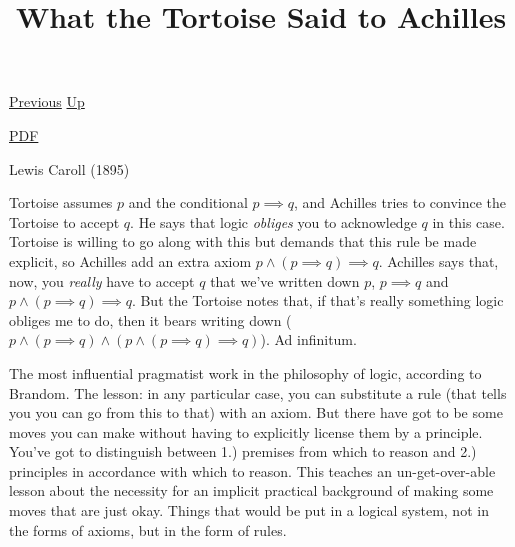 \documentclass[12pt,a4paper]{report}
\begin{document}
 \href{doc/phil/PhilProblems/Universals.html}{Previous} 
 \href{doc/phil/PhilProblems.html}{Up} 

 \href{doc/phil/PhilProblems/WhattheTortoiseSaidtoAchilles.pdf}{PDF} 
\title{What the Tortoise Said to Achilles}

Lewis Caroll (1895)

Tortoise assumes $p$ and the conditional $p \implies q$, and Achilles tries to convince the Tortoise to accept $q$. He says that logic \emph{obliges} you to acknowledge $q$ in this case. Tortoise is willing to go along with this but demands that this rule be made explicit, so Achilles add an extra axiom $p \land (p \implies q) \implies q$. Achilles says that, now, you \emph{really} have to accept $q$ that we've written down $p$, $p \implies q$ and $p \land (p \implies q) \implies q$. But the Tortoise notes that, if that's really something logic obliges me to do, then it bears writing down ($p \land (p \implies q) \land (p \land (p \implies q) \implies q)$). Ad infinitum.

The most influential pragmatist work in the philosophy of logic, according to Brandom. The lesson: in any particular case, you can substitute a rule (that tells you you can go from this to that) with an axiom. But there have got to be some moves you can make without having to explicitly license them by a principle.  You've got to distinguish between 1.) premises from which to reason and 2.) principles in accordance with which to reason. This teaches an un-get-over-able lesson about the necessity for an implicit practical background of making some moves that are just okay. Things that would be put in a logical system, not in the forms of axioms, but in the form of rules.
\end{document}
